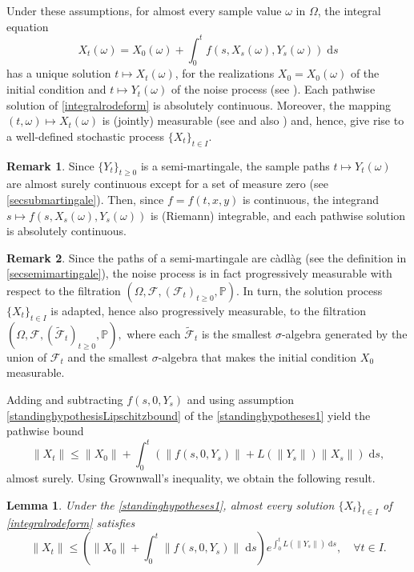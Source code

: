\documentclass[reqno,12pt]{amsart}
\theoremstyle{plain} %
\newtheorem{lemma}{Lemma}[section]
\theoremstyle{definition} %
\newtheorem{remark}{Remark}[section]
\begin{document}
Under these assumptions, for almost every sample value $\omega$ in $\Omega$, the integral equation
\begin{equation}
    \label{integralrodeform}
    X_t(\omega) = X_0(\omega) + \int_0^t f(s, X_s(\omega), Y_s(\omega)) \;\mathrm{d}s
\end{equation}
has a unique solution $t\mapsto X_t(\omega)$, for the realizations $X_0 = X_0(\omega)$ of the initial condition and $t\mapsto Y_t(\omega)$ of the noise process (see \cite[Theorem 1.1]{CoddingtonLevinson1985}). Each pathwise solution of \cref{integralrodeform} is absolutely continuous. Moreover, the mapping $(t, \omega) \mapsto X_t(\omega)$ is (jointly) measurable (see \cite[Section 2.1.2]{HanKloeden2017} and also \cite[Lemma 4.51]{AB2006}) and, hence, give rise to a well-defined stochastic process $\{X_t\}_{t\in I}.$

\begin{remark}
    Since $\{Y_t\}_{t\geq 0}$ is a semi-martingale, the sample paths $t \mapsto Y_t(\omega)$ are almost surely continuous except for a set of measure zero (see \cref{secsubmartingale}). Then, since $f=f(t, x, y)$ is continuous, the integrand $s \mapsto f(s, X_s(\omega), Y_s(\omega))$ is (Riemann) integrable, and each pathwise solution is absolutely continuous.
\end{remark}

\begin{remark}
    Since the paths of a semi-martingale are c\`adl\`ag (see the definition in \cref{secsemimartingale}), the noise process is in fact progressively measurable with respect to the filtration $(\Omega, \mathcal{F}, (\mathcal{F}_t)_{t\geq 0}, \mathbb{P}).$ In turn, the solution process $\{X_t\}_{t\in I}$ is adapted, hence also progressively measurable, to the filtration $(\Omega, \mathcal{F}, (\tilde{\mathcal{F}}_t)_{t\geq 0}, \mathbb{P}),$ where each $\tilde{\mathcal{F}}_t$ is the smallest $\sigma$-algebra generated by the union of $\mathcal{F}_t$ and the smallest $\sigma$-algebra that makes the initial condition $X_0$ measurable.
\end{remark}

Adding and subtracting $f(s, 0, Y_s)$ and using assumption \cref{standinghypothesisLipschitzbound} of the \cref{standinghypotheses1} yield the pathwise bound
\[
    \|X_t\| \leq \|X_0\| + \int_0^t \left(\|f(s, 0, Y_s)\| + L(\|Y_s\|)\|X_s\|\right)\;\mathrm{d}s,
\]
almost surely. Using Grownwall's inequality, we obtain the following result.
\begin{lemma}
    Under the \cref{standinghypotheses1}, almost every solution $\{X_t\}_{t\in I}$ of \cref{integralrodeform} satisfies
    \begin{equation}
        \label{XtboundLXMt}
        \|X_t\| \leq \left(\|X_0\| + \int_0^t \|f(s, 0, Y_s)\|\;\mathrm{d}s\right) e^{\int_0^t L(\|Y_s\|)\;\mathrm{d}s}, \quad \forall t\in I.
    \end{equation}
\end{lemma}
\end{document}
